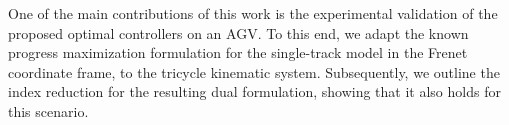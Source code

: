 \par One of the main contributions of this work is the experimental validation of the proposed optimal controllers on an \ac{AGV}. To this end, we adapt the known progress maximization formulation for the single-track model in the Frenet coordinate frame, to the tricycle kinematic system. Subsequently, we outline the index reduction for the resulting dual formulation, showing that it also holds for this scenario.
